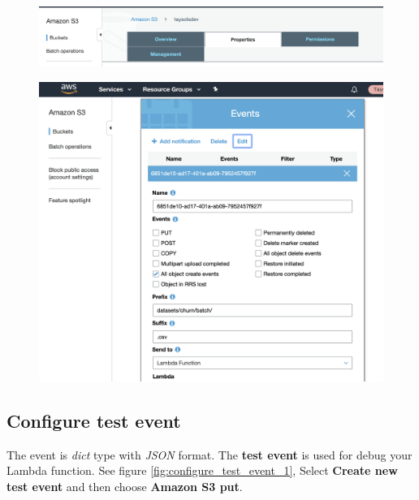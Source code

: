 \documentclass[12pt]{article}
\begin{document}
\begin{figure}[H]
\centering
\begin{minipage}{1\textwidth}
  \centering
  \includegraphics[width=1\linewidth]{S3_bucket_event_1.png}
   \caption{}
   \label{fig:S3_bucket_event_1}
\end{minipage}%
\end{figure}

\begin{figure}[H]
\centering
\begin{minipage}{1\textwidth}
  \centering
  \includegraphics[width=1\linewidth]{S3_bucket_event_2.png}
   \caption{}
   \label{fig:S3_bucket_event_2}
\end{minipage}%
\end{figure}



\subsection{Configure test event}
The event is \textit{dict} type with \textit{JSON} format. The \textbf{test event} is used for debug your Lambda function. See figure \ref{fig:configure_test_event_1}, Select \textbf{Create new test event} and then choose \textbf{Amazon S3 put}.
\end{document}
